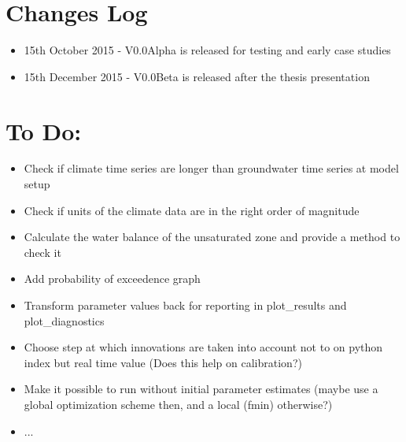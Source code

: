 \section{Changes Log}
\begin{itemize}
	\item{15th October 2015 - V0.0Alpha is released for testing and early case studies}
	\item{15th December 2015 - V0.0Beta is released after the thesis presentation}
\end{itemize}

\section{To Do:}

\begin{itemize}

\item{Check if climate time series are longer than groundwater time series at model setup}
\item{Check if units of the climate data are in the right order of magnitude}
\item{Calculate the water balance of the unsaturated zone and provide a method to check it}
\item{Add probability of exceedence graph}
\item{Transform parameter values back for reporting in plot\_results and plot\_diagnostics}
\item{Choose step at which innovations are taken into account not to on python index but real time value (Does this help on calibration?) }
\item{Make it possible to run without initial parameter estimates (maybe use a global optimization scheme then, and a local (fmin) otherwise?)}
\item{...}
\end{itemize}